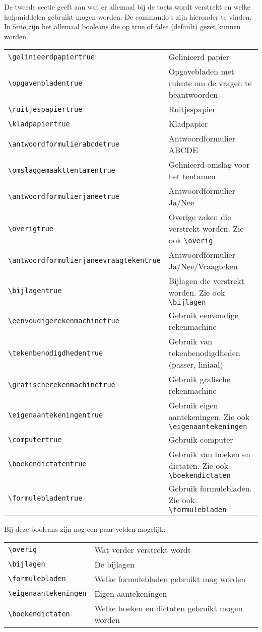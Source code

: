 \documentclass[dutch,a4paper,12pt,addpoints,fleqn,oneside]{tisdexam}
\begin{document}
\bigskip
De tweede sectie geeft aan wat er allemaal bij de toets wordt verstrekt en welke hulpmiddelen gebruikt
mogen worden. De commando's zijn hieronder te vinden. In feite zijn het allemaal booleans die op true
of false (default) gezet kunnen worden.

\bigskip
\begin{tabular}{lp{8cm}}
\verb|\gelinieerdpapiertrue| & Gelinieerd papier \\
\verb|\opgavenbladentrue| & Opgavebladen met ruimte om de vragen te beantwoorden \\
\verb|\ruitjespapiertrue| & Ruitjespapier \\
\verb|\kladpapiertrue| & Kladpapier \\
\verb|\antwoordformulierabcdetrue| & Antwoordformulier ABCDE \\
\verb|\omslaggemaakttentamentrue| & Gelinieerd omslag voor het tentamen \\
\verb|\antwoordformulierjaneetrue| & Antwoordformulier Ja/Nee \\
\verb|\overigtrue| & Overige zaken die verstrekt worden. Zie ook \verb|\overig| \\
\verb|\antwoordformulierjaneevraagtekentrue| & Antwoordformulier Ja/Nee/Vraagteken \\
\verb|\bijlagentrue| & Bijlagen die verstrekt worden. Zie ook \verb|\bijlagen| \\
\verb|\eenvoudigerekenmachinetrue| & Gebruik eenvoudige rekenmachine \\ 
\verb|\tekenbenodigdhedentrue| & Gebruik van tekenbenodigdheden (passer, liniaal) \\
\verb|\grafischerekenmachinetrue| & Gebruik grafische rekenmachine \\
\verb|\eigenaantekeningentrue| & Gebruik eigen aantekeningen. Zie ook \verb|\eigenaantekeningen| \\
\verb|\computertrue| & Gebruik computer \\
\verb|\boekendictatentrue| & Gebruik van boeken en dictaten. Zie ook \verb|\boekendictaten| \\
\verb|\formulebladentrue| & Gebruik formulebladen. Zie ook \verb|\formulebladen| \\
\end{tabular}

\medskip
Bij deze booleans zijn nog een paar velden mogelijk:

\bigskip
\begin{tabular}{lp{15cm}}
\verb|\overig| & Wat verder verstrekt wordt \\
\verb|\bijlagen| & De bijlagen \\
\verb|\formulebladen| & Welke formulebladen gebruikt mag worden \\
\verb|\eigenaantekeningen| & Eigen aantekeningen \\
\verb|\boekendictaten| & Welke boeken en dictaten gebruikt mogen worden \\
\end{tabular}
\end{document}
